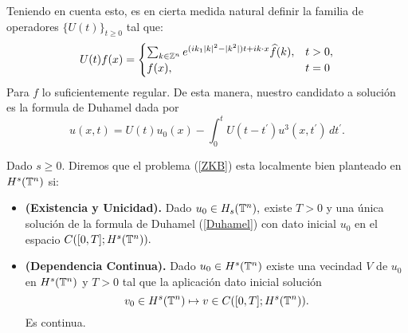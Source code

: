 Teniendo en cuenta esto, es en cierta medida natural definir la familia de operadores $\{U(t)\}_{t\geq 0}$ tal que:
$$U(t)f(x)=\begin{cases}
    \sum_{k\in\mathbb{Z}^n}e^{(ik_1|k|^2-|k^2|)t+ik\cdot x}\widehat{f}(k), & t>0,\\
    f(x), &t=0
\end{cases}$$
Para $f$ lo suficientemente regular. De esta manera, nuestro candidato a solución es la formula de Duhamel dada por
\begin{equation}\label{Duhamel}
u(x,t)=U(t)u_0(x)-\int_0^tU(t-t^\prime)u^3(x,t^\prime)\,dt^\prime.
\end{equation}
\begin{definition}
    Dado $s\geq 0.$ Diremos que el problema (\ref{ZKB}) esta localmente bien planteado en $H^s(\mathbb{T}^n)$ si:
    \begin{itemize}
        \item \textbf{(Existencia y Unicidad).} Dado $u_0\in H_s(\mathbb{T}^n),$ existe $T>0$ y una única solución de la formula de Duhamel (\ref{Duhamel}) con dato inicial $u_0$ en el espacio $C([0,T];H^s(\mathbb{T}^n)).$
        \item \textbf{(Dependencia Continua).} Dado $u_0\in H^s(\mathbb{T}^n)$ existe una vecindad $V$ de $u_0$ en $H^s(\mathbb{T}^n)$ y $T>0$ tal que la aplicación dato inicial solución 
        $$v_0\in H^s(\mathbb{T}^n)\mapsto v\in C([0,T];H^s(\mathbb{T}^n)). $$ 
        Es continua.
    \end{itemize}
\end{definition}